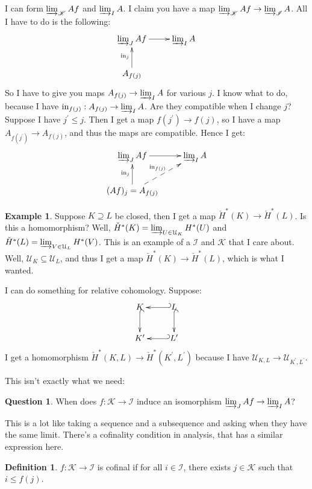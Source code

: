 \documentclass{amsart}
\theoremstyle{theorem}
\theoremstyle{definition}
\newtheorem{definition}[theorem]{Definition}
\newtheorem{example}[theorem]{Example}
\newtheorem{question}[theorem]{Question}
\def\cI{\mathscr I}\def\cJ{\mathscr J}\def\cK{\mathscr K}\def\cL{\mathscr L}
\newcommand\cHH{\check{H}}
\begin{document}
I can form $\varinjlim_{\cK}Af$ and $\varinjlim_{I}A$. I claim you have a map $\varinjlim_{\cK}Af\to\varinjlim_{\cI}A$. All I have to do is the following:
\begin{equation*}
\xymatrix{
	\varinjlim_{J}Af\ar[r] & \varinjlim_{I}A\\
	A_{f(j)}\ar[u]^{\mathrm{in}_j}
}
\end{equation*}
So I have to give you maps $A_{f(j)}\to\varinjlim_{I}A$ for various $j$. I know what to do, because I have $\mathrm{in}_{f(j)}:A_{f(j)}\to\varinjlim_{I}A$. Are they compatible when I change $j$? Suppose I have $j^\prime\leq j$. Then I get a map $f(j^\prime)\to f(j)$, so I have a map $A_{f(j^\prime)}\to A_{f(j)}$, and thus the maps are compatible. Hence I get:
\begin{equation*}
\xymatrix{
	\varinjlim_{J}Af\ar[r] & \varinjlim_{I}A\\
	(Af)_j=A_{f(j)}\ar@{-->}[ur]^{\mathrm{in}_{f(j)}}\ar[u]^{\mathrm{in}_j}
}
\end{equation*}
\begin{example}
Suppose $K\supseteq L$ be closed, then I get a map $\cHH^\ast(K)\to\cHH^\ast(L)$. Is this a homomorphism? Well, $\cHH^\ast(K)=\varinjlim_{U\in\mathcal{U}_K}H^\ast(U)$ and $\cHH^\ast(L)=\varinjlim_{V\in\mathcal{U}_L}H^\ast(V)$. This is an example of a $\cI$ and $\cK$ that I care about. Well, $\mathcal{U}_K\subseteq\mathcal{U}_L$, and thus I get a map $\cHH^\ast(K)\to\cHH^\ast(L)$, which is what I wanted.

I can do something for relative cohomology. Suppose:
\begin{equation*}
\xymatrix{K\ar@{^(->}[d] & L\ar@{^(->}[d]\ar@{_(->}[l] \\ K^\prime & L^\prime\ar@{_(->}[l]}
\end{equation*}
I get a homomorphism $\cHH^\ast(K,L)\to \cHH^\ast(K^\prime,L^\prime)$ because I have $\mathcal{U}_{K,L}\to\mathcal{U}_{K^\prime,L^\prime}$.
\end{example}
This isn't exactly what we need:
\begin{question}
When does $f:\cK\to\cI$ induce an isomorphism $\varinjlim_{J}Af\to\varinjlim_{I}A$?
\end{question}
This is a lot like taking a sequence and a subsequence and asking when they have the same limit. There's a cofinality condition in analysis, that has a similar expression here.
\begin{definition}
$f:\cK\to\cI$ is cofinal if for all $i\in\cI$, there exists $j\in\cK$ such that $i\leq f(j)$.
\end{definition}
\end{document}
